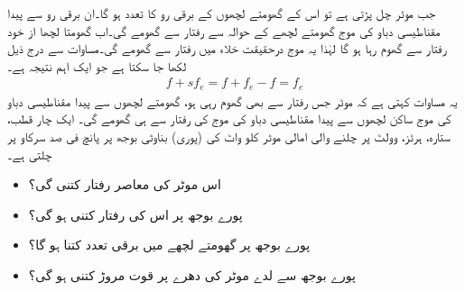 جب موٹر چل پڑتی ہے تو اس کے گھومتے لچھوں کے برقی رو کا تعدد  ہو گا۔ان برقی رو سے پیدا مقناطیسی دباو کی موج گھومتے لچھے کے حوالہ سے  رفتار سے گھومے گی۔اب گھومتا لچھا از خود  رفتار   سے گھوم رہا ہو گا لہٰذا یہ موج درحقیقت خلاء میں  رفتار سے گھومے گی۔مساوات   سے درج ذیل لکھا جا سکتا ہے جو ایک اہم نتیجہ ہے۔
\begin{align}
f+s f_e=f +f_e-f=f_e
\end{align} 
 یہ مساوات کہتی ہے کہ موٹر جس رفتار سے بھی گھوم رہی ہو، گھومتے لچھوں سے پیدا مقناطیسی دباو کی موج ساکن لچھوں سے پیدا مقناطیسی دباو کی موج کی رفتار سے ہی گھومے گی۔
%
ایک چار قطب، ستارہ،  ہرٹز،  وولٹ  پر چلنے والی امالی موٹر  کلو واٹ کی (پوری) بناوٹی بوجھ پر پانچ فی صد سرکاو پر چلتی ہے۔
\begin{itemize}
\item
اس موٹر کی معاصر رفتار کتنی گی؟
\item
پورے بوجھ پر اس کی رفتار کتنی ہو گی؟
\item
پورے بوجھ پر گھومتے لچھے میں برقی تعدد کتنا ہو گا؟
\item
پورے بوجھ سے لدے موٹر کی دھرے پر قوت مروڑ کتنی ہو گی؟
\end{itemize}


